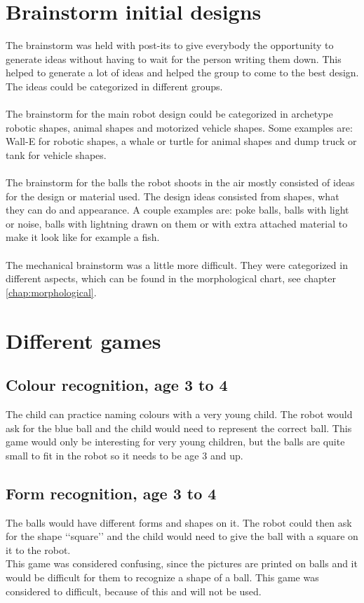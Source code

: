 \documentclass[11pt,twoside,a4paper]{report}
\begin{document}
\begin{appendices}
\chapter{Brainstorm initial designs}
The brainstorm was held with post-its to give everybody the opportunity to generate ideas without having to wait for the person writing them down. This helped to generate a lot of ideas and helped the group to come to the best design. The ideas could be categorized in different groups.\\
 \\
The brainstorm for the main robot design could be categorized in archetype robotic shapes, animal shapes and motorized vehicle shapes. Some examples are: Wall-E for robotic shapes, a whale or turtle for animal shapes and dump truck or tank for vehicle shapes.\\
 \\
The brainstorm for the balls the robot shoots in the air mostly consisted of ideas for the design or material used. The design ideas consisted from shapes, what they can do and appearance. A couple examples are: poke balls, balls with light or noise, balls with lightning drawn on them or with extra attached material to make it look like for example a fish.\\
 \\
The mechanical brainstorm was a little more difficult. They were categorized in different aspects, which can be found in the morphological chart, see chapter \ref{chap:morphological}.
\label{appendix:brainstorm}
\chapter{Different games}
\section{Colour recognition, age 3 to 4}
The child can practice naming colours with a very young child. The robot would ask for the blue ball and the child would need to represent the correct ball. This game would only be interesting for very young children, but the balls are quite small to fit in the robot so it needs to be age 3 and up.
\section{Form recognition, age 3 to 4}
The balls would have different forms and shapes on it. The robot could then ask for the shape \lq\lq{}square\rq\rq{} and the child would need to give the ball with a square on it to the robot.\\
This game was considered confusing, since the pictures are printed on balls and it would be difficult for them to recognize a shape of a ball. This game was considered to difficult, because of this and will not be used.

\end{appendices}
\end{document}
